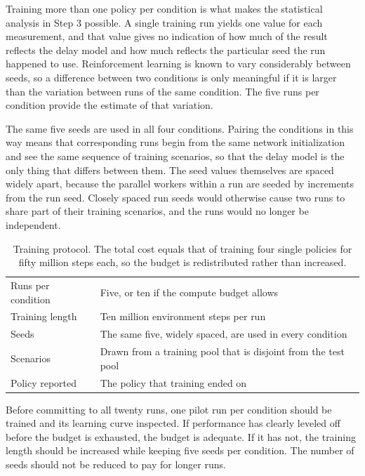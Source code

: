 \documentclass[11pt,a4paper]{article}
\begin{document}
Training more than one policy per condition is what makes the statistical
analysis in Step 3 possible. A single training run yields one value for each
measurement, and that value gives no indication of how much of the result
reflects the delay model and how much reflects the particular seed the run
happened to use. Reinforcement learning is known to vary considerably between
seeds, so a difference between two conditions is only meaningful if it is larger
than the variation between runs of the same condition. The five runs per
condition provide the estimate of that variation.

The same five seeds are used in all four conditions. Pairing the conditions in
this way means that corresponding runs begin from the same network
initialization and see the same sequence of training scenarios, so that the
delay model is the only thing that differs between them. The seed values
themselves are spaced widely apart, because the parallel workers within a run
are seeded by increments from the run seed. Closely spaced run seeds would
otherwise cause two runs to share part of their training scenarios, and the
runs would no longer be independent.

\begin{table}[h]
\centering
\begin{tabular}{@{}ll@{}}
\toprule
Runs per condition & Five, or ten if the compute budget allows \\
Training length    & Ten million environment steps per run \\
Seeds              & The same five, widely spaced, are used in every condition \\
Scenarios          & Drawn from a training pool that is disjoint from the test pool \\
Policy reported    & The policy that training ended on \\
\bottomrule
\end{tabular}
\caption{Training protocol. The total cost equals that of training four single
policies for fifty million steps each, so the budget is redistributed rather
than increased.}
\label{tab:training}
\end{table}

Before committing to all twenty runs, one pilot run per condition should be
trained and its learning curve inspected. If performance has clearly leveled off
before the budget is exhausted, the budget is adequate. If it has not, the
training length should be increased while keeping five seeds per condition. The
number of seeds should not be reduced to pay for longer runs.
\end{document}
